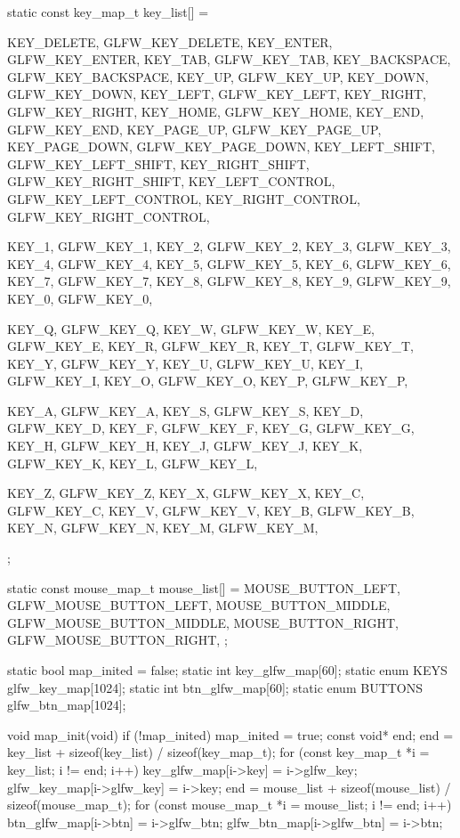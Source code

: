 \documentclass[14pt,a4paper]{extarticle}
\theoremstyle{definition}
\renewcommand{\[}{\begin{singlespace}\begin{equation*}}
\renewcommand{\]}{\end{equation*}\end{singlespace}}
\begin{document}
\begin{multicols}{2}
\begin{ccode}
static const key_map_t key_list[] = {
    {KEY_DELETE,        GLFW_KEY_DELETE},
    {KEY_ENTER,         GLFW_KEY_ENTER},
    {KEY_TAB,           GLFW_KEY_TAB},
    {KEY_BACKSPACE,     GLFW_KEY_BACKSPACE},
    {KEY_UP,            GLFW_KEY_UP},
    {KEY_DOWN,          GLFW_KEY_DOWN},
    {KEY_LEFT,          GLFW_KEY_LEFT},
    {KEY_RIGHT,         GLFW_KEY_RIGHT},
    {KEY_HOME,          GLFW_KEY_HOME},
    {KEY_END,           GLFW_KEY_END},
    {KEY_PAGE_UP,       GLFW_KEY_PAGE_UP},
    {KEY_PAGE_DOWN,     GLFW_KEY_PAGE_DOWN},
    {KEY_LEFT_SHIFT,    GLFW_KEY_LEFT_SHIFT},
    {KEY_RIGHT_SHIFT,   GLFW_KEY_RIGHT_SHIFT},
    {KEY_LEFT_CONTROL,  GLFW_KEY_LEFT_CONTROL},
    {KEY_RIGHT_CONTROL, GLFW_KEY_RIGHT_CONTROL},

    {KEY_1, GLFW_KEY_1}, {KEY_2, GLFW_KEY_2}, {KEY_3, GLFW_KEY_3},
    {KEY_4, GLFW_KEY_4}, {KEY_5, GLFW_KEY_5}, {KEY_6, GLFW_KEY_6},
    {KEY_7, GLFW_KEY_7}, {KEY_8, GLFW_KEY_8}, {KEY_9, GLFW_KEY_9},
    {KEY_0, GLFW_KEY_0},

    {KEY_Q, GLFW_KEY_Q}, {KEY_W, GLFW_KEY_W}, {KEY_E, GLFW_KEY_E},
    {KEY_R, GLFW_KEY_R}, {KEY_T, GLFW_KEY_T}, {KEY_Y, GLFW_KEY_Y},
    {KEY_U, GLFW_KEY_U}, {KEY_I, GLFW_KEY_I}, {KEY_O, GLFW_KEY_O},
    {KEY_P, GLFW_KEY_P},

    {KEY_A, GLFW_KEY_A}, {KEY_S, GLFW_KEY_S}, {KEY_D, GLFW_KEY_D},
    {KEY_F, GLFW_KEY_F}, {KEY_G, GLFW_KEY_G}, {KEY_H, GLFW_KEY_H},
    {KEY_J, GLFW_KEY_J}, {KEY_K, GLFW_KEY_K}, {KEY_L, GLFW_KEY_L},

    {KEY_Z, GLFW_KEY_Z}, {KEY_X, GLFW_KEY_X}, {KEY_C, GLFW_KEY_C},
    {KEY_V, GLFW_KEY_V}, {KEY_B, GLFW_KEY_B}, {KEY_N, GLFW_KEY_N},
    {KEY_M, GLFW_KEY_M},
};

static const mouse_map_t mouse_list[] = {
    {MOUSE_BUTTON_LEFT, GLFW_MOUSE_BUTTON_LEFT},
    {MOUSE_BUTTON_MIDDLE, GLFW_MOUSE_BUTTON_MIDDLE},
    {MOUSE_BUTTON_RIGHT, GLFW_MOUSE_BUTTON_RIGHT},
};

static bool map_inited = false;
static int key_glfw_map[60];
static enum KEYS glfw_key_map[1024];
static int btn_glfw_map[60];
static enum BUTTONS glfw_btn_map[1024];

void map_init(void) {
    if (!map_inited) {
        map_inited = true;
        const void* end;
        end = key_list + sizeof(key_list) / sizeof(key_map_t);
        for (const key_map_t *i = key_list; i != end; i++) {
            key_glfw_map[i->key] = i->glfw_key;
            glfw_key_map[i->glfw_key] = i->key;
        }
        end = mouse_list + sizeof(mouse_list) / sizeof(mouse_map_t);
        for (const mouse_map_t *i = mouse_list; i != end; i++) {
            btn_glfw_map[i->btn] = i->glfw_btn;
            glfw_btn_map[i->glfw_btn] = i->btn;
        }
    }
}


\end{ccode}
\end{multicols}
\end{document}

